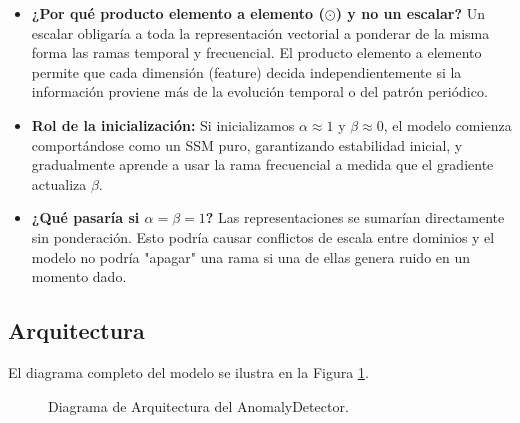 \documentclass[12pt,a4paper]{article}
\begin{document}
\begin{itemize}
    \item \textbf{¿Por qué producto elemento a elemento ($\odot$) y no un escalar?} Un escalar obligaría a toda la representación vectorial a ponderar de la misma forma las ramas temporal y frecuencial. El producto elemento a elemento permite que cada dimensión (feature) decida independientemente si la información proviene más de la evolución temporal o del patrón periódico.
    \item \textbf{Rol de la inicialización:} Si inicializamos $\alpha \approx 1$ y $\beta \approx 0$, el modelo comienza comportándose como un SSM puro, garantizando estabilidad inicial, y gradualmente aprende a usar la rama frecuencial a medida que el gradiente actualiza $\beta$.
    \item \textbf{¿Qué pasaría si $\alpha = \beta = 1$?} Las representaciones se sumarían directamente sin ponderación. Esto podría causar conflictos de escala entre dominios y el modelo no podría "apagar" una rama si una de ellas genera ruido en un momento dado.
\end{itemize}

\subsection{Arquitectura}

El diagrama completo del modelo se ilustra en la Figura \ref{fig:arquitectura}.

\begin{figure}[htbp]
\centering
{}
\caption{Diagrama de Arquitectura del AnomalyDetector.}
\label{fig:arquitectura}
\end{figure}
\end{document}
